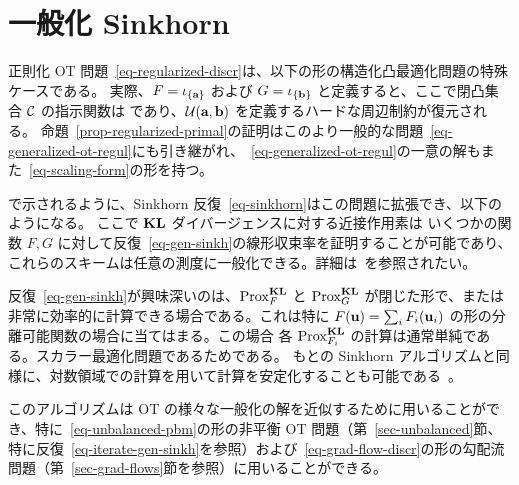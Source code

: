 \section{一般化 Sinkhorn}
\label{sec-generalized}

正則化 OT 問題~\eqref{eq-regularized-discr}は、以下の形の構造化凸最適化問題の特殊ケースである。
実際、$F=\iota_{\{\mathrm{\textbf{a}}\}}$ および $G=\iota_{\{\mathrm{\textbf{b}}\}}$ と定義すると、ここで閉凸集合 $\mathcal{C}$ の指示関数は
であり、$\mathcal{U}(\mathrm{\textbf{a}},\mathrm{\textbf{b}})$ を定義するハードな周辺制約が復元される。
命題~\ref{prop-regularized-primal}の証明はこのより一般的な問題~\eqref{eq-generalized-ot-regul}にも引き継がれ、~\eqref{eq-generalized-ot-regul}の一意の解もまた~\eqref{eq-scaling-form}の形を持つ。

\citep{2015-Peyre-siims,FrognerNIPS,2016-chizat-sinkhorn,karlsson2016generalized}で示されるように、Sinkhorn 反復~\eqref{eq-sinkhorn}はこの問題に拡張でき、以下のようになる。
ここで $\mathrm{\textbf{KL}}$ ダイバージェンスに対する近接作用素は
いくつかの関数 $F,G$ に対して反復~\eqref{eq-gen-sinkh}の線形収束率を証明することが可能であり、これらのスキームは任意の測度に一般化できる。詳細は~\citep{2016-chizat-sinkhorn}を参照されたい。

反復~\eqref{eq-gen-sinkh}が興味深いのは、$\operatorname{Prox}_{F}^{\mathrm{\textbf{KL}}}$ と $\operatorname{Prox}_{G}^{\mathrm{\textbf{KL}}}$ が閉じた形で、または非常に効率的に計算できる場合である。これは特に $F(\mathrm{\textbf{u}}) = \sum_i F_i(\mathrm{\textbf{u}}_i)$ の形の分離可能関数の場合に当てはまる。この場合
各 $\operatorname{Prox}_{F_i}^{\mathrm{\textbf{KL}}}$ の計算は通常単純である。スカラー最適化問題であるためである。
もとの Sinkhorn アルゴリズムと同様に、対数領域での計算を用いて計算を安定化することも可能である~\citep{2016-chizat-sinkhorn}。

このアルゴリズムは OT の様々な一般化の解を近似するために用いることができ、特に~\eqref{eq-unbalanced-pbm}の形の非平衡 OT 問題（第~\ref{sec-unbalanced}節、特に反復~\eqref{eq-iterate-gen-sinkh}を参照）および~\eqref{eq-grad-flow-discr}の形の勾配流問題（第~\ref{sec-grad-flows}節を参照）に用いることができる。


